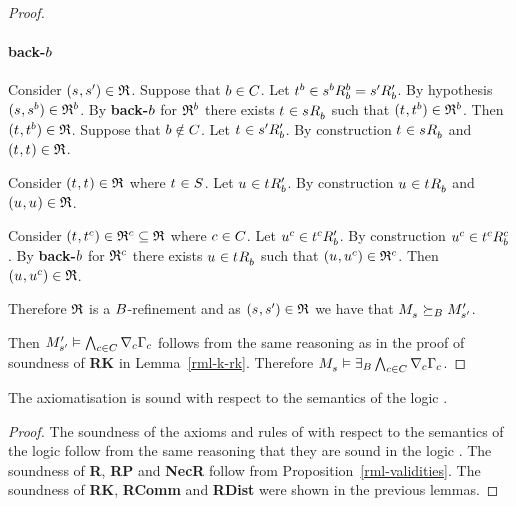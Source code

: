 \begin{proof}
\paragraph{back-$\agentB$}
Consider $(\kStateS, \kStateSP) \in \refinement$.
Suppose that $\agentB \in \agentsC$.
Let $\kStateT[\agentB] \in \kSuccessorsB[\agentB]{\kStateS[\agentB]} = \kSuccessorsPB{\kStateSP}$.
By hypothesis $(\kStateS, \kStateS[\agentB]) \in \refinement^\agentB$.
By {\bf back-$\agentB$} for $\refinement^\agentB$ there exists $\kStateT \in \kSuccessorsB{\kStateS}$ such that $(\kStateT, \kStateT[\agentB]) \in \refinement^\agentB$.
Then $(\kStateT, \kStateT[\agentB]) \in \refinement$.
Suppose that $\agentB \notin \agentsC$.
Let $\kStateT \in \kSuccessorsPB{\kStateSP}$.
By construction $\kStateT \in \kSuccessorsB{\kStateS}$ and $(\kStateT, \kStateT) \in \refinement$.

Consider $(\kStateT, \kStateT) \in \refinement$ where $\kStateT \in \kStates$.
Let $\kStateU \in \kSuccessorsPB{\kStateT}$.
By construction $\kStateU \in \kSuccessorsB{\kStateT}$ and $(\kStateU, \kStateU) \in \refinement$.

Consider $(\kStateT, \kStateT[\agentC]) \in \refinement^\agentC \subseteq \refinement$ where $\agentC \in \agentsC$.
Let $\kStateU[\agentC] \in \kSuccessorsPB{\kStateT[\agentC]}$.
By construction $\kStateU[\agentC] \in \kSuccessorsB[\agentC]{\kStateT[\agentC]}$.
By {\bf back-$\agentB$} for $\refinement^\agentC$ there exists $\kStateU \in \kSuccessorsB{\kStateT}$ such that $(\kStateU, \kStateU[\agentC]) \in \refinement^\agentC$.
Then $(\kStateU, \kStateU[\agentC]) \in \refinement$.

Therefore $\refinement$ is a $\agentsB$-refinement and as $(\kStateS, \kStateSP) \in \refinement$ we have that $\kPModel{\kStateS} \simulatesBs \kPModelP{\kStateSP}$.

Then $\kPModelP{\kStateSP} \entails \bigwedge_{\agentC \in \agentsC} \coversC \Gamma_\agentC$ follows from the same reasoning as in the proof of soundness of {\bf RK} in Lemma~\ref{rml-k-rk}.
Therefore $\kPModel{\kStateS} \entails \somerefsBs \bigwedge_{\agentC \in \agentsC} \coversC \Gamma_\agentC$.
\end{proof}

\begin{lemma}\label{rml-k-sound}
The axiomatisation \axiomRmlK{} is sound with respect to the semantics of the logic \logicRmlK{}.
\end{lemma}

\begin{proof}
The soundness of the axioms and rules of \axiomK{} with respect to the semantics of the logic \logicRmlK{} follow from the same reasoning that they are sound in the logic \logicK{}.
The soundness of {\bf R}, {\bf RP} and {\bf NecR} follow from Proposition~\ref{rml-validities}.
The soundness of {\bf RK}, {\bf RComm} and {\bf RDist} were shown in the previous lemmas.
\end{proof}

